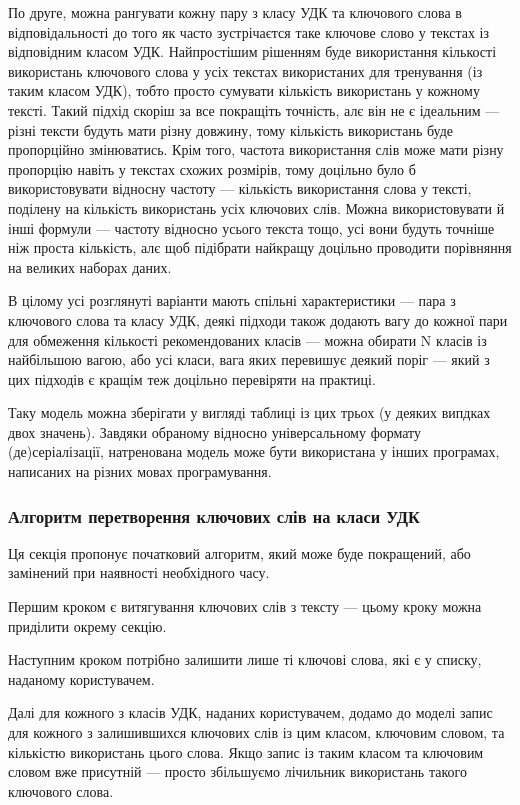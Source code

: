 \documentclass[14pt]{extarticle}
\begin{document}
  По друге, можна рангувати \cite{wiki_weight_function}
  кожну пару з класу УДК та ключового слова
  в відповідальності до того як часто зустрічаєтся таке ключове слово
  у текстах із відповідним класом УДК.
  Найпростішим рішенням буде використання кількості
  використань ключового слова у усіх текстах використаних для тренування
  (із таким класом УДК),
  тобто просто сумувати кількість використань у кожному тексті.
  Такий підхід скоріш за все покращіть точність, алє він не є ідеальним ---
  різні тексти будуть мати різну довжину,
  тому кількість використань буде пропорційно змінюватись.
  Крім того, частота використання слів може мати різну пропорцію навіть
  у текстах схожих розмірів, тому доцільно було б використовувати відносну
  частоту --- кількість використання слова у тексті,
  поділену на кількість використань усіх ключових слів.
  Можна використовувати й інші формули ---
  частоту відносно усього текста тощо,
  усі вони будуть точніше ніж проста кількість,
  алє щоб підібрати найкращу доцільно проводити порівняння
  на великих наборах даних.

  В цілому усі розглянуті варіанти мають спільні характеристики ---
  пара з ключового слова та класу УДК,
  деякі підходи також додають вагу до кожної пари для обмеження кількості
  рекомендованих класів --- можна обирати N класів із найбільшою вагою,
  або усі класи, вага яких перевишує деякий поріг ---
  який з цих підходів є кращім теж доцільно перевіряти на практиці.

  Таку модель можна зберігати у вигляді таблиці із цих трьох
  (у деяких випдках двох значень).
  Завдяки обраному відносно універсальному формату (де)серіалізації,
  натренована модель може бути використана у інших програмах,
  написаних на різних мовах програмування.

  \subsubsection{Алгоритм перетворення ключових слів на класи УДК}
  Ця секція пропонує початковий алгоритм, який може буде покращений,
  або замінений при наявності необхідного часу.

  Першим кроком є витягування ключових слів з тексту ---
  цьому кроку можна приділити окрему секцію.

  Наступним кроком потрібно залишити лише ті ключові слова, які є у списку,
  наданому користувачем.

  Далі для кожного з класів УДК, наданих користувачем,
  додамо до моделі запис для кожного з залишившихся ключових слів із цим класом,
  ключовим словом, та кількістю використань цього слова.
  Якщо запис із таким класом та ключовим словом вже присутній ---
  просто збільшуємо лічильник використань такого ключового слова.
\end{document}
